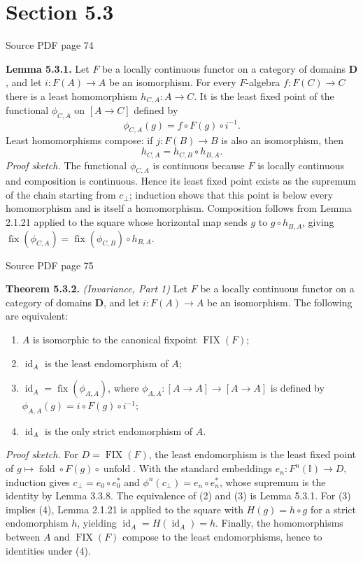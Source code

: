 \documentclass[11pt]{article}
\newcommand{\leanmarker}[2]{%
  \Needspace{3\baselineskip}%
  \marginnote{\hyperlink{#1}{\color{LeanTeal}\fbox{\scriptsize Lean}}}%
  \hypertarget{#1}{\textbf{#2.}}%
}
\newcommand{\sourcepage}[1]{\par\medskip\noindent\textcolor{SourceGray}{\scriptsize Source PDF page #1}\par\smallskip}
\begin{document}
\section*{Section 5.3}
\sourcepage{74}
\leanmarker{lemma-5-3-1}{Lemma 5.3.1} Let \(F\) be a locally continuous functor on a category of domains \(\mathbf D\), and let \(i:F(A)\to A\) be an isomorphism. For every \(F\)-algebra \(f:F(C)\to C\) there is a least homomorphism \(h_{C,A}:A\to C\). It is the least fixed point of the functional \(\phi_{C,A}\) on \([A\to C]\) defined by
\[
  \phi_{C,A}(g)=f\circ F(g)\circ i^{-1}.
\]
Least homomorphisms compose: if \(j:F(B)\to B\) is also an isomorphism, then
\[
  h_{C,A}=h_{C,B}\circ h_{B,A}.
\]
\emph{Proof sketch.} The functional \(\phi_{C,A}\) is continuous because \(F\) is locally continuous and composition is continuous. Hence its least fixed point exists as the supremum of the chain starting from \(c_\bot\); induction shows that this point is below every homomorphism and is itself a homomorphism. Composition follows from Lemma 2.1.21 applied to the square whose horizontal map sends \(g\) to \(g\circ h_{B,A}\), giving \(\operatorname{fix}(\phi_{C,A})=\operatorname{fix}(\phi_{C,B})\circ h_{B,A}\).

\sourcepage{75}
\leanmarker{thm-5-3-2}{Theorem 5.3.2} \emph{(Invariance, Part 1)} Let \(F\) be a locally continuous functor on a category of domains \(\mathbf D\), and let \(i:F(A)\to A\) be an isomorphism. The following are equivalent:
\begin{enumerate}
\item \(A\) is isomorphic to the canonical fixpoint \(\operatorname{FIX}(F)\);
\item \(\operatorname{id}_A\) is the least endomorphism of \(A\);
\item \(\operatorname{id}_A=\operatorname{fix}(\phi_{A,A})\), where \(\phi_{A,A}:[A\to A]\to[A\to A]\) is defined by \(\phi_{A,A}(g)=i\circ F(g)\circ i^{-1}\);
\item \(\operatorname{id}_A\) is the only strict endomorphism of \(A\).
\end{enumerate}
\emph{Proof sketch.} For \(D=\operatorname{FIX}(F)\), the least endomorphism is the least fixed point of \(g\mapsto \operatorname{fold}\circ F(g)\circ\operatorname{unfold}\). With the standard embeddings \(e_n:F^n(\mathbb I)\to D\), induction gives \(c_\bot=e_0\circ e_0^*\) and \(\phi^n(c_\bot)=e_n\circ e_n^*\), whose supremum is the identity by Lemma 3.3.8. The equivalence of (2) and (3) is Lemma 5.3.1. For (3) implies (4), Lemma 2.1.21 is applied to the square with \(H(g)=h\circ g\) for a strict endomorphism \(h\), yielding \(\operatorname{id}_A=H(\operatorname{id}_A)=h\). Finally, the homomorphisms between \(A\) and \(\operatorname{FIX}(F)\) compose to the least endomorphisms, hence to identities under (4).
\end{document}
